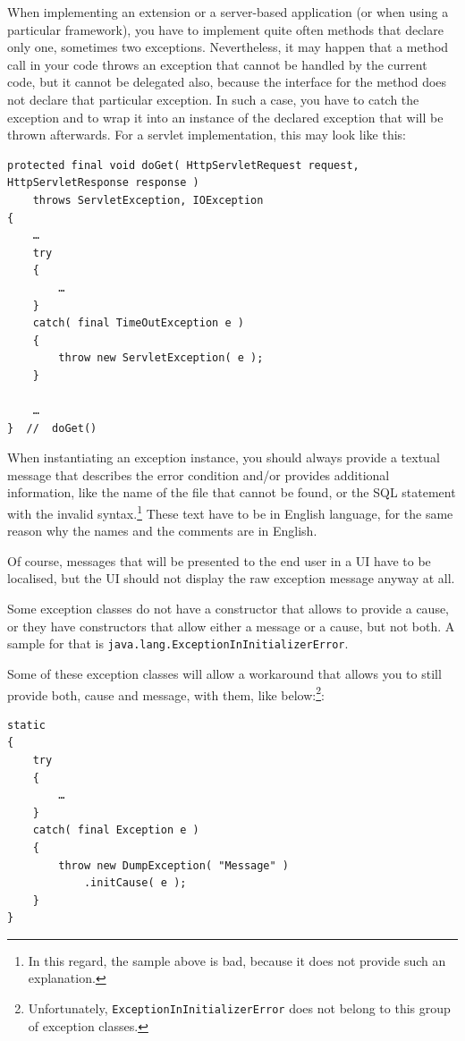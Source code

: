 \documentclass[11pt,a4paper, titlepage, parskip=half, headsepline, footsepline, cleardoublepage=current, headheight=1cm]{scrbook}
\begin{document}
When implementing an extension or a server-based application (or when using a particular framework), you have to implement quite often methods that declare only one, sometimes two exceptions. Nevertheless, it may happen that a method call in your code throws an exception that cannot be handled by the current code, but it cannot be delegated also, because the interface for the method does not declare that particular exception. In such a case, you have to catch the exception and to wrap it into an instance of the declared exception that will be thrown afterwards. For a servlet implementation\autocite{JAKARTA_EE_HTTPSERVLET_CLASS}, this may look like this:
\begin{lstlisting}
protected final void doGet( HttpServletRequest request, HttpServletResponse response )
    throws ServletException, IOException
{
    …
    try
    {
        …
    }
    catch( final TimeOutException e )
    {
        throw new ServletException( e );
    }

    …
}  //  doGet()
\end{lstlisting}

When instantiating an exception instance, you should always provide a textual message that describes the error condition and/or provides additional information, like the name of the file that cannot be found, or the SQL statement with the invalid syntax.\footnote{In this regard, the sample above is bad, because it does not provide such an explanation.} These text have to be in English language, for the same reason why the names and the comments are in English.

Of course, messages that will be presented to the end user in a UI have to be localised, but the UI should not display the raw exception message anyway at all.

Some exception classes do not have a constructor that allows to provide a cause, or they have constructors that allow either a message or a cause, but not both. A sample for that is \lstinline|java.lang.ExceptionInInitializerError|\autocite{ORACLE_DOC_EXCEPTIONININITIALIZERERROR_CLASS}.

Some of these exception classes will allow a workaround that allows you to still provide both, cause and message, with them, like below:\footnote{Unfortunately, \lstinline|ExceptionInInitializerError| does not belong to this group of exception classes.}: 
\begin{lstlisting}
static
{
    try
    {
        …    
    }
    catch( final Exception e )
    {
        throw new DumpException( "Message" )
            .initCause( e );    
    }
}
\end{lstlisting}
\end{document}
